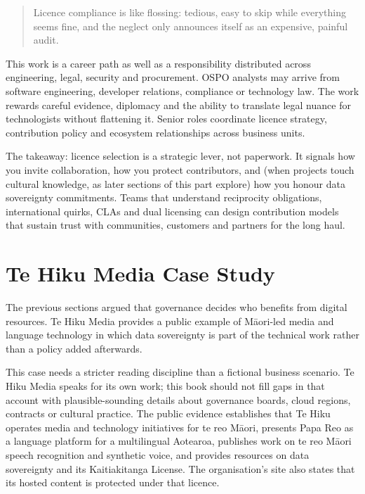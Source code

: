 \begin{quote}\small
Licence compliance is like flossing: tedious, easy to skip while everything seems fine, and the neglect only announces itself as an expensive, painful audit.
\end{quote}


This work is a career path as well as a responsibility distributed across engineering, legal, security and procurement. OSPO analysts may arrive from software engineering, developer relations, compliance or technology law. The work rewards careful evidence, diplomacy and the ability to translate legal nuance for technologists without flattening it. Senior roles coordinate licence strategy, contribution policy and ecosystem relationships across business units.


The takeaway: licence selection is a strategic lever, not paperwork. It signals how you invite collaboration, how you protect contributors, and (when projects touch cultural knowledge, as later sections of this part explore) how you honour data sovereignty commitments. Teams that understand reciprocity obligations, international quirks, CLAs and dual licensing can design contribution models that sustain trust with communities, customers and partners for the long haul.

\section{Te Hiku Media Case Study}
The previous sections argued that governance decides who benefits from digital resources. Te Hiku Media provides a public example of Māori-led media and language technology in which data sovereignty is part of the technical work rather than a policy added afterwards.


This case needs a stricter reading discipline than a fictional business scenario. Te Hiku Media speaks for its own work; this book should not fill gaps in that account with plausible-sounding details about governance boards, cloud regions, contracts or cultural practice. The public evidence establishes that Te Hiku operates media and technology initiatives for te reo Māori, presents Papa Reo as a language platform for a multilingual Aotearoa, publishes work on te reo Māori speech recognition and synthetic voice, and provides resources on data sovereignty and its Kaitiakitanga License. The organisation's site also states that its hosted content is protected under that licence. \autocite{te-hiku-tech,te-hiku-kaitiakitanga}


